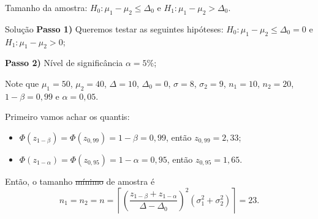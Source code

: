\documentclass[9pt]{beamer}
\begin{document}
\begin{frame}{Tamanho da amostra: $H_0:\mu_1 - \mu_2 \leq \Delta_0$ e $H_1: \mu_1 - \mu_2 > \Delta_0$.}

\normalsize
\begin{block}{Solução}
	\textbf{Passo 1)} Queremos testar as seguintes hipóteses: $H_0: \mu_1 - \mu_2 \leq \Delta_0 = 0$ e $H_1: \mu_1 - \mu_2 > 0$;
	
	\textbf{Passo 2)} Nível de significância $\alpha=5\%$;
	
	Note que $\mu_1=50$, $\mu_2=40$, $\Delta=10$, $\Delta_0=0$, $\sigma=8$, $\sigma_2=9$, $n_1=10$, $n_2=20$, $1-\beta=0,99$ e $\alpha=0,05$. 
	
	Primeiro vamos achar os quantis:
	\begin{itemize}
		\item $\Phi\left(z_{1-\beta}\right)=\Phi\left(z_{0,99}\right)=1-\beta=0,99$, então $z_{0,99}=2,33$;
		\item $\Phi\left(z_{1-\alpha}\right)=\Phi\left(z_{0,95}\right)=1-\alpha=0,95$, então $z_{0,95}=1,65$.
	\end{itemize}
	Então, o tamanho \sout{mínimo} de amostra é
	$$n_1=n_2=n=\left\lceil \left( \frac{z_{1-\beta} + z_{1-\alpha}}{\Delta - \Delta_0}\right)^2 (\sigma_1^2 + \sigma_2^2) \right\rceil = 23.$$
\end{block}

\end{frame}
\end{document}
